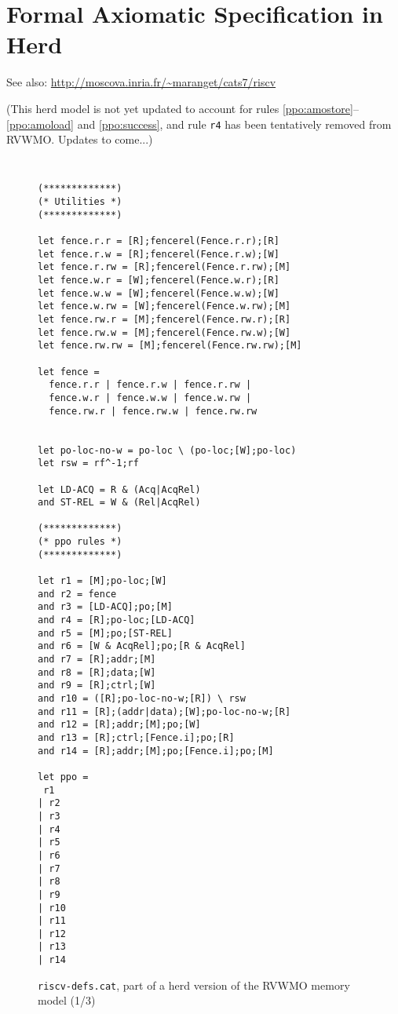 \clearpage
\section{Formal Axiomatic Specification in Herd}

See also: \url{http://moscova.inria.fr/~maranget/cats7/riscv}

(This herd model is not yet updated to account for rules \ref{ppo:amostore}--\ref{ppo:amoload} and \ref{ppo:success}, and rule {\tt r4} has been tentatively removed from RVWMO.  Updates to come...)

\begin{figure}[h!]
  {
  \tt\bfseries\centering\footnotesize
  \begin{lstlisting}
(*************)
(* Utilities *)
(*************)

let fence.r.r = [R];fencerel(Fence.r.r);[R]
let fence.r.w = [R];fencerel(Fence.r.w);[W]
let fence.r.rw = [R];fencerel(Fence.r.rw);[M]
let fence.w.r = [W];fencerel(Fence.w.r);[R]
let fence.w.w = [W];fencerel(Fence.w.w);[W]
let fence.w.rw = [W];fencerel(Fence.w.rw);[M]
let fence.rw.r = [M];fencerel(Fence.rw.r);[R]
let fence.rw.w = [M];fencerel(Fence.rw.w);[W]
let fence.rw.rw = [M];fencerel(Fence.rw.rw);[M]

let fence = 
  fence.r.r | fence.r.w | fence.r.rw |
  fence.w.r | fence.w.w | fence.w.rw |
  fence.rw.r | fence.rw.w | fence.rw.rw


let po-loc-no-w = po-loc \ (po-loc;[W];po-loc)
let rsw = rf^-1;rf

let LD-ACQ = R & (Acq|AcqRel)
and ST-REL = W & (Rel|AcqRel)

(*************)
(* ppo rules *)
(*************)

let r1 = [M];po-loc;[W]
and r2 = fence
and r3 = [LD-ACQ];po;[M]
and r4 = [R];po-loc;[LD-ACQ]
and r5 = [M];po;[ST-REL]
and r6 = [W & AcqRel];po;[R & AcqRel]
and r7 = [R];addr;[M]
and r8 = [R];data;[W]
and r9 = [R];ctrl;[W]
and r10 = ([R];po-loc-no-w;[R]) \ rsw
and r11 = [R];(addr|data);[W];po-loc-no-w;[R]
and r12 = [R];addr;[M];po;[W]
and r13 = [R];ctrl;[Fence.i];po;[R]
and r14 = [R];addr;[M];po;[Fence.i];po;[M]

let ppo =
 r1
| r2
| r3
| r4
| r5
| r6
| r7
| r8
| r9
| r10
| r11
| r12
| r13
| r14
\end{lstlisting}
  }
  \caption{{\tt riscv-defs.cat}, part of a herd version of the RVWMO memory model (1/3)}
  \label{fig:herd1}
\end{figure}

